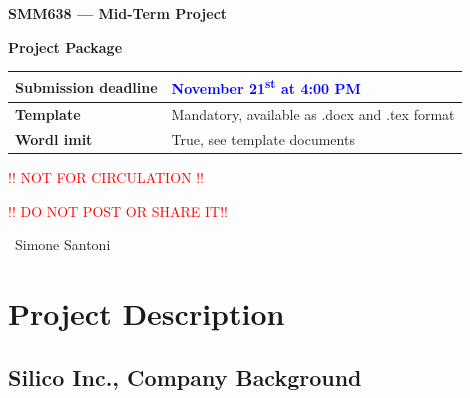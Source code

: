 \documentclass[11pt]{article}
\begin{document}
\thispagestyle{empty}

\pagestyle{fancy}
\fancyhead{} %

\begin{center}
	\textbf{\LARGE SMM638 --- Mid-Term Project}
	
	\vspace{1em}
	
	\textbf{\large Project Package}
	
	\vspace{10em}
	
	\begin{table}[!htbp]
		\begin{small}
			\begin{center}
				\begin{tabular}[c]{|l|l|}
					\hline
					\textbf{Submission deadline} &
					\textcolor{blue}{November 21\textsuperscript{st} at 4:00 PM} \\
					\hline
					\textbf{Template} & Mandatory, available as .docx and .tex format\\
					\hline
					\textbf{Wordl imit} & True, see template documents\\
					\hline
				\end{tabular}
			\end{center}
		\end{small}
	\end{table}

	\vspace{10em}

	\centering

	\textcolor{red}{!! NOT FOR CIRCULATION !!}

	\textcolor{red}{!! DO NOT POST OR SHARE IT!!}

	\vspace{5em}


	\textcopyright~Simone Santoni
\end{center}

\clearpage

\tableofcontents

\clearpage

\section{Project Description}

\subsection{Silico Inc., Company Background}
\end{document}

